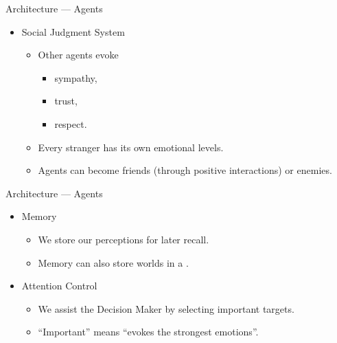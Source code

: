    \begin{frame}{Architecture --- Agents}
      \begin{itemize}
         \item {Social Judgment System}
         \begin{itemize}
            \item Other agents evoke
            \begin{itemize}
               \item sympathy,
               \item trust,
               \item respect.
            \end{itemize}
            \pause
            \item Every stranger has its own emotional levels.
            \item Agents can become friends (through positive interactions) or enemies.
         \end{itemize}
      \end{itemize}
      
   \end{frame}
   
   \begin{frame}{Architecture --- Agents}
      \begin{itemize}
         \item Memory
         \begin{itemize}
            \item We store our perceptions for later recall.
            \item Memory can also store  worlds in a .
         \end{itemize}
         \pause
         \item Attention Control
         \begin{itemize}
            \item We assist the Decision Maker by selecting important targets.
            \item ``Important'' means ``evokes the strongest emotions''.
         \end{itemize}
      \end{itemize}
      
   \end{frame}
   
